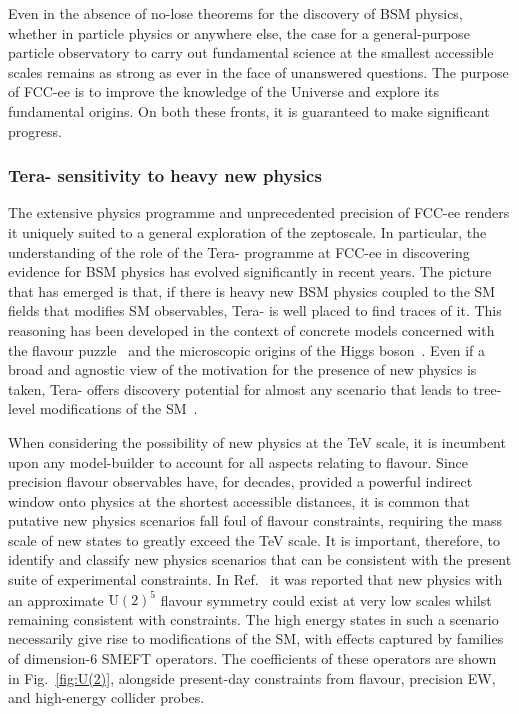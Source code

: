 Even in the absence of no-lose theorems for the discovery of BSM physics, whether in particle physics or anywhere else, 
the case for a general-purpose particle observatory to carry out fundamental science at the smallest accessible scales 
remains as strong as ever in the face of unanswered questions. 
The purpose of FCC-ee is to improve the knowledge of the Universe and explore its fundamental origins. 
On both these fronts, it is guaranteed to make significant progress.

\subsubsection{Tera-\texorpdfstring{\PZ}{Z} sensitivity to heavy new physics}

The extensive physics programme and unprecedented precision of FCC-ee 
renders it uniquely suited to a general exploration of the zeptoscale. 
In particular, the understanding of the role of the \mbox{Tera-\PZ} programme at FCC-ee 
in discovering evidence for BSM physics has evolved significantly in recent years.  
The picture that has emerged is that, if there is heavy new BSM physics coupled to the SM fields that modifies SM observables, 
\mbox{Tera-\PZ} is well placed to find traces of it.  
This reasoning has been developed in the context of concrete models concerned with the flavour puzzle~\cite{Allwicher:2023shc} 
and the microscopic origins of the Higgs boson~\cite{Stefanek:2024kds, Knapen:2024bxw}. 
Even if a broad and agnostic view of the motivation for the presence of new physics is taken, 
\mbox{Tera-\PZ} offers discovery potential for almost any scenario 
that leads to tree-level modifications of the SM~\cite{Allwicher:2024sso, Gargalionis:2024jaw}.

When considering the possibility of new physics at the TeV scale, 
it is incumbent upon any model-builder to account for all aspects relating to flavour.  
Since precision flavour observables have, for decades, 
provided a powerful indirect window onto physics at the shortest accessible distances, 
it is common that putative new physics scenarios fall foul of flavour constraints, 
requiring the mass scale of new states to greatly exceed the TeV scale.  
It is important, therefore, to identify and classify new physics scenarios 
that can be consistent with the present suite of experimental constraints.  
In Ref.~\cite{Allwicher:2023shc} it was reported that new physics with an approximate $\text{U}(2)^5$ flavour symmetry 
could exist at very low scales whilst remaining consistent with constraints. 
The high energy states in such a scenario necessarily give rise to modifications of the SM, 
with effects captured by families of dimension-6 SMEFT operators.  
The coefficients of these operators are shown in Fig.~\ref{fig:U(2)}, 
alongside present-day constraints from flavour, precision EW, and high-energy collider probes.   

